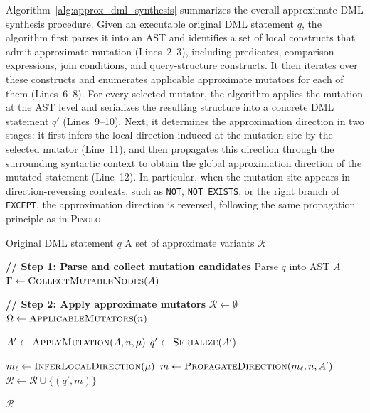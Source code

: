 Algorithm~\ref{alg:approx_dml_synthesis} summarizes the overall approximate DML synthesis procedure.
Given an executable original DML statement \(q\), the algorithm first parses it into an AST and identifies a set of local constructs that admit approximate mutation (Lines~2--3), including predicates, comparison expressions, join conditions, and query-structure constructs.
It then iterates over these constructs and enumerates applicable approximate mutators for each of them (Lines~6--8).
For every selected mutator, the algorithm applies the mutation at the AST level and serializes the resulting structure into a concrete DML statement \(q'\) (Lines~9--10).
Next, it determines the approximation direction in two stages: it first infers the local direction induced at the mutation site by the selected mutator (Line~11), and then propagates this direction through the surrounding syntactic context to obtain the global approximation direction of the mutated statement (Line~12).
In particular, when the mutation site appears in direction-reversing contexts, such as \texttt{NOT}, \texttt{NOT EXISTS}, or the right branch of \texttt{EXCEPT}, the approximation direction is reversed, following the same propagation principle as in \textsc{Pinolo}~\cite{hao2023pinolo}.

\begin{algorithm}[t]
	\caption{Approximate DML Synthesis}
	\footnotesize
	\label{alg:approx_dml_synthesis}
	\begin{algorithmic}[1]
		\Require Original DML statement $q$
		\Ensure A set of approximate variants $\mathcal{R}$
		
		\State \textbf{// Step 1: Parse and collect mutation candidates}
		\State Parse $q$ into AST $A$
		\State $\Gamma \gets \textsc{CollectMutableNodes}(A)$
		
		\State \textbf{// Step 2: Apply approximate mutators}
		\State $\mathcal{R} \gets \emptyset$
		\State $\Omega \gets \textsc{ApplicableMutators}(n)$
		
		\State $A' \gets \textsc{ApplyMutation}(A, n, \mu)$
		\State $q' \gets \textsc{Serialize}(A')$
		
		\State $m_\ell \gets \textsc{InferLocalDirection}(\mu)$
		\State $m \gets \textsc{PropagateDirection}(m_\ell, n, A')$
		\State $\mathcal{R} \gets \mathcal{R} \cup \{(q', m)\}$
		\EndFor
		\EndFor
		
		\State \Return $\mathcal{R}$
	\end{algorithmic}
\end{algorithm}

